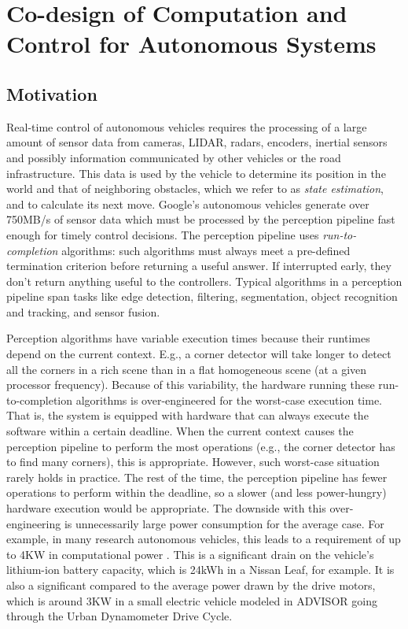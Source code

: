 \section{Co-design of Computation and Control for Autonomous Systems}
\subsection{Motivation}

Real-time control of autonomous vehicles requires the processing of a large amount of sensor data from cameras, LIDAR, radars, encoders, inertial sensors and possibly information communicated by other vehicles or the road infrastructure.
This data is used by the vehicle to determine its position in the world and that of neighboring obstacles, which we refer to as \emph{state estimation}, and to calculate its next move.
Google's autonomous vehicles generate over 750MB/s of sensor data \cite{diamandis2015bold} which must be processed by the perception pipeline fast enough for timely control decisions.
The perception pipeline uses \emph{run-to-completion} algorithms: such algorithms must always meet a pre-defined termination criterion before returning a useful answer.
If interrupted early, they don't return anything useful to the controllers.
Typical algorithms in a perception pipeline span tasks like edge detection, filtering, segmentation, object recognition and tracking, and sensor fusion. 
 
Perception algorithms have variable execution times because their runtimes depend on the current context.
E.g., a corner detector will take longer to detect all the corners in a rich scene than in a flat homogeneous scene (at a given processor frequency).
Because of this variability, the hardware running these run-to-completion algorithms is over-engineered for the worst-case execution time.
That is, the system is equipped with hardware that can always execute the software within a certain deadline.
When the current context causes the perception pipeline to perform the most operations (e.g., the corner detector has to find many corners), this is appropriate.
However, such worst-case situation rarely holds in practice. 
The rest of the time, the perception pipeline has fewer operations to perform within the deadline, so a slower (and less power-hungry) hardware execution would be appropriate.
The downside with this over-engineering is unnecessarily large power consumption for the average case.
For example, in many research autonomous vehicles, this leads to a requirement of up to 4KW in computational power \cite{powerNagoya}. 
This is a significant drain on the vehicle's lithium-ion battery capacity, which is 24kWh in a Nissan Leaf, for example.
It is also a significant compared to the average power drawn by the drive motors, which is around 3KW in a small electric vehicle modeled in ADVISOR \cite{nreladvisor} going through the Urban Dynamometer Drive Cycle. 

